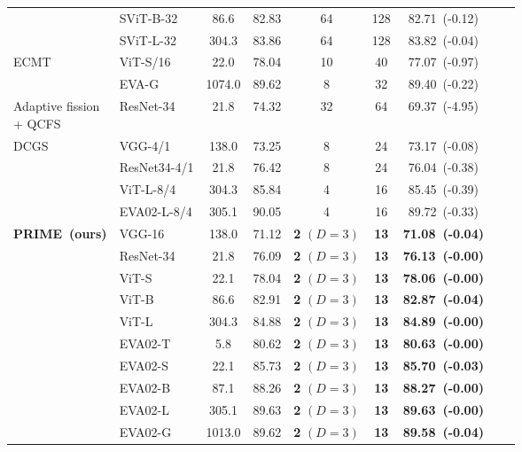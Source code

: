 \begin{table}[t!]
{\begin{tabular}{llccccccc}
      & SViT-B-32 & 86.6  & 82.83 & 64           & 128         & 82.71~(-0.12) \\
      & SViT-L-32 & 304.3 & 83.86 & 64           & 128         & 83.82~(-0.04) \\
    \cmidrule(lr){2-7}
    \multirow{2}{*}{ECMT\cite{ECMT}}
      & ViT-S/16       & 22.0     & 78.04 &10        & 40      & 77.07~(-0.97) \\
      & EVA-G          & 1074.0   & 89.62 &8         & 32      & 89.40~(-0.22) \\
    \cmidrule(lr){2-7}
    \makecell[l]{Adaptive fission\cite{adaptive}\\ + QCFS\cite{QCFS}}
      & ResNet-34      & 21.8   & 74.32 & 32           & 64          & 69.37~(-4.95) \\
    \cmidrule(lr){2-7}
    \multirow{4}{*}{DCGS\cite{dcgs}}
      & VGG-4/1        & 138.0    & 73.25 &  8         &  24      &  73.17~(-0.08) \\
      & ResNet34-4/1   & 21.8   & 76.42 & 8         &  24      &  76.04~(-0.38) \\
      & ViT-L-8/4      & 304.3  & 85.84 &  4         &  16       &  85.45~(-0.39) \\
      & EVA02-L-8/4    & 305.1  & 90.05 &  4         &  16       & 89.72~(-0.33) \\
    \midrule
    \multirow{10}{*}{\textbf{PRIME~(ours)}}
      & VGG-16         & 138.0    & 71.12 & \textbf{2} $(D{=}3)$  & \textbf{13}          & \textbf{71.08~(-0.04)} \\
      & ResNet-34      & 21.8   & 76.09 & \textbf{2} $(D{=}3)$  & \textbf{13}          & \textbf{76.13~(-0.00)} \\
      & ViT-S          & 22.1   & 78.04 & \textbf{2} $(D{=}3)$  & \textbf{13}          & \textbf{78.06~(-0.00)} \\
      & ViT-B          & 86.6   & 82.91 & \textbf{2} $(D{=}3)$  & \textbf{13}          & \textbf{82.87~(-0.04)} \\
      & ViT-L          & 304.3  & 84.88 & \textbf{2} $(D{=}3)$  & \textbf{13}          & \textbf{84.89~(-0.00)} \\
      & EVA02-T        & 5.8    & 80.62 & \textbf{2} $(D{=}3)$  & \textbf{13}          & \textbf{80.63~(-0.00)} \\
      & EVA02-S        & 22.1   & 85.73 & \textbf{2} $(D{=}3)$  & \textbf{13}          & \textbf{85.70~(-0.03)} \\
      & EVA02-B        & 87.1   & 88.26 & \textbf{2} $(D{=}3)$  & \textbf{13}          & \textbf{88.27~(-0.00)} \\
      & EVA02-L        & 305.1  & 89.63 & \textbf{2} $(D{=}3)$  & \textbf{13}          & \textbf{89.63~(-0.00)} \\
      & EVA02-G        & 1013.0   & 89.62 & \textbf{2} $(D{=}3)$  & \textbf{13}          & \textbf{89.58~(-0.04)} \\
    \bottomrule
  \end{tabular}
  }
\end{table}


